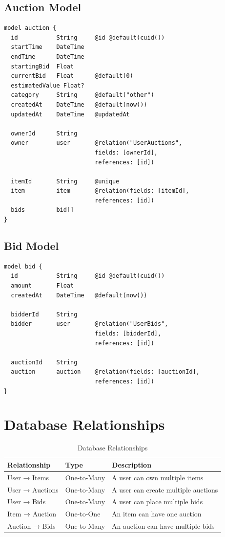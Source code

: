 \documentclass[12pt,a4paper]{report}
\begin{document}
\subsection{Auction Model}

\begin{lstlisting}[caption=Auction Schema (Prisma)]
model auction {
  id           String     @id @default(cuid())
  startTime    DateTime
  endTime      DateTime
  startingBid  Float
  currentBid   Float      @default(0)
  estimatedValue Float?    
  category     String     @default("other")
  createdAt    DateTime   @default(now())
  updatedAt    DateTime   @updatedAt

  ownerId      String
  owner        user       @relation("UserAuctions", 
                          fields: [ownerId], 
                          references: [id])

  itemId       String     @unique
  item         item       @relation(fields: [itemId], 
                          references: [id])
  bids         bid[]
}
\end{lstlisting}

\subsection{Bid Model}

\begin{lstlisting}[caption=Bid Schema (Prisma)]
model bid {
  id           String     @id @default(cuid())
  amount       Float
  createdAt    DateTime   @default(now())

  bidderId     String
  bidder       user       @relation("UserBids", 
                          fields: [bidderId], 
                          references: [id])

  auctionId    String
  auction      auction    @relation(fields: [auctionId], 
                          references: [id])
}
\end{lstlisting}

\section{Database Relationships}

\begin{table}[H]
\centering
\begin{tabularx}{\textwidth}{|l|l|X|}
\hline
\textbf{Relationship} & \textbf{Type} & \textbf{Description} \\
\hline
User → Items & One-to-Many & A user can own multiple items \\
\hline
User → Auctions & One-to-Many & A user can create multiple auctions \\
\hline
User → Bids & One-to-Many & A user can place multiple bids \\
\hline
Item → Auction & One-to-One & An item can have one auction \\
\hline
Auction → Bids & One-to-Many & An auction can have multiple bids \\
\hline
\end{tabularx}
\caption{Database Relationships}
\end{table}
\end{document}

